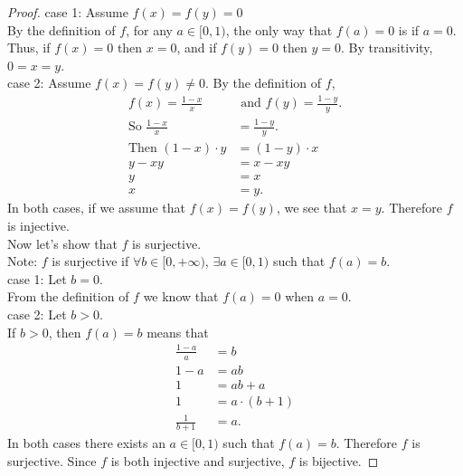 \documentclass{amsart}
\begin{document}
\begin{enumerate}[1.]
\begin{proof}
case 1: Assume $f(x) = f(y) = 0$ \\
    By the definition of $f$, for any $a\in[0,1)$, the only way 
    that $f(a) = 0$ is if $a = 0$. Thus, if $f(x) = 0$ then $x = 0$,
    and if $f(y) = 0$ then $y = 0$. By transitivity, $0 = x = y$.\\

case 2: Assume $f(x) = f(y) \neq 0$. By the definition of $f$,
\begin{align*}
    f(x) = \frac{1-x}{x} &\text{ and } f(y) = \frac{1-y}{y}. \\
    \text{So } \frac{1-x}{x} &= \frac{1-y}{y}. \\
    \text{Then } (1 - x)\cdot y &= (1 - y)\cdot x \\
    y - xy &= x - xy \\
    y  &= x \\
    x &= y. 
\end{align*}
In both cases, if we assume that $f(x) = f(y)$, we see that $x = y$.
Therefore $f$ is injective. \\

Now let's show that $f$ is surjective. \\
Note: $f$ is surjective if $\forall b\in [0, +\infty)$, 
$\exists a\in [0,1)$ such that $f(a) = b$. \\

case 1: Let $b = 0$. \\
    From the definition of $f$ we know that $f(a) = 0$ when $a = 0$. \\
    
case 2: Let $b > 0$.\\
    If $b > 0$, then $f(a) = b$ means that
\begin{align*}
    \frac{1-a}{a} &= b \\
    1 - a &= ab \\
    1 &= ab + a \\
    1 &= a\cdot (b + 1) \\
    \frac{1}{b+1} &= a.
\end{align*}
In both cases there exists an $a\in [0,1)$ such that $f(a) = b$.
Therefore $f$ is surjective.
Since $f$ is both injective and surjective, $f$ is bijective.

\end{proof}

\end{enumerate}
\end{document}
